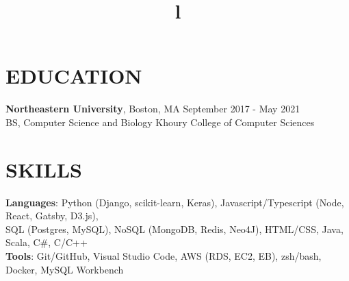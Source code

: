 \documentclass[resmargin]{res}
\begin{document}
\begin{resume}

\section{EDUCATION} 
\textbf{Northeastern University}, Boston, MA \hfill September 2017 - May 2021 \\
BS, Computer Science and Biology \hfill Khoury College of Computer Sciences

\section{SKILLS}
\textbf{Languages}: Python (Django, scikit-learn, Keras), Javascript/Typescript (Node, React, Gatsby, D3.js),\\ SQL (Postgres, MySQL), NoSQL (MongoDB, Redis, Neo4J), HTML/CSS, Java, Scala, C\#, C/C++\\
\textbf{Tools}: Git/GitHub, Visual Studio Code, AWS (RDS, EC2, EB), zsh/bash, Docker, MySQL Workbench

\begin{format}
\title{l}\\
\\
\body\\
\end{format}


\end{resume}
\end{document}
